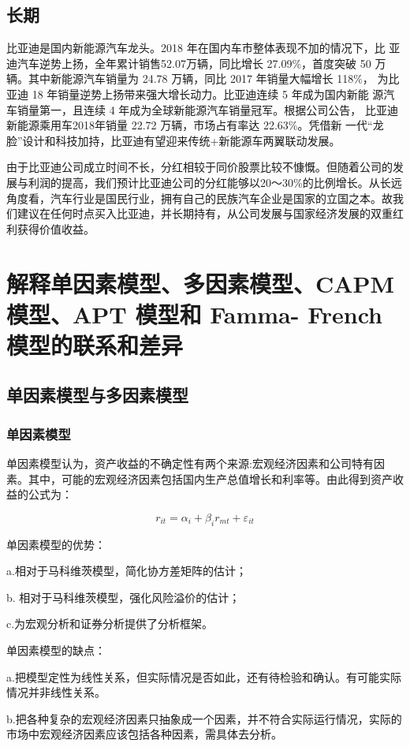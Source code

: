 \documentclass[UTF8]{ctexart}
\begin{document}
\subsection{长期}
比亚迪是国内新能源汽车龙头。2018 年在国内车市整体表现不加的情况下，比 亚迪汽车逆势上扬，全年累计销售52.07万辆，同比增长 27.09\%，首度突破 50 万辆。其中新能源汽车销量为 24.78 万辆，同比 2017 年销量大幅增长 118\%， 为比亚迪 18 年销量逆势上扬带来强大增长动力。比亚迪连续 5 年成为国内新能 源汽车销量第一，且连续 4 年成为全球新能源汽车销量冠军。根据公司公告， 比亚迪新能源乘用车2018年销量 22.72 万辆，市场占有率达 22.63\%。凭借新 一代“龙脸”设计和科技加持，比亚迪有望迎来传统+新能源车两翼联动发展。\par
由于比亚迪公司成立时间不长，分红相较于同价股票比较不慷慨。但随着公司的发展与利润的提高，我们预计比亚迪公司的分红能够以20～30\%的比例增长。从长远角度看，汽车行业是国民行业，拥有自己的民族汽车企业是国家的立国之本。故我们建议在任何时点买入比亚迪，并长期持有，从公司发展与国家经济发展的双重红利获得价值收益。\par
\section{ 解释单因素模型、多因素模型、CAPM 模型、APT 模型和 Famma-
 French 模型的联系和差异}
 \subsection{单因素模型与多因素模型}
\subsubsection{单因素模型}
单因素模型认为，资产收益的不确定性有两个来源:宏观经济因素和公司特有因素。其中，可能的宏观经济因素包括国内生产总值增长和利率等。由此得到资产收益的公式为：\par
$$r_{it} = \alpha_{i} + \beta_{i}r_{mt} + \varepsilon _{it}$$\par
单因素模型的优势：\par
a.相对于马科维茨模型，简化协方差矩阵的估计；\par
b. 相对于马科维茨模型，强化风险溢价的估计；\par
c.为宏观分析和证券分析提供了分析框架。\par
单因素模型的缺点：\par
a.把模型定性为线性关系，但实际情况是否如此，还有待检验和确认。有可能实际情况并非线性关系。\par
b.把各种复杂的宏观经济因素只抽象成一个因素，并不符合实际运行情况，实际的市场中宏观经济因素应该包括各种因素，需具体去分析。\par
\end{document}
